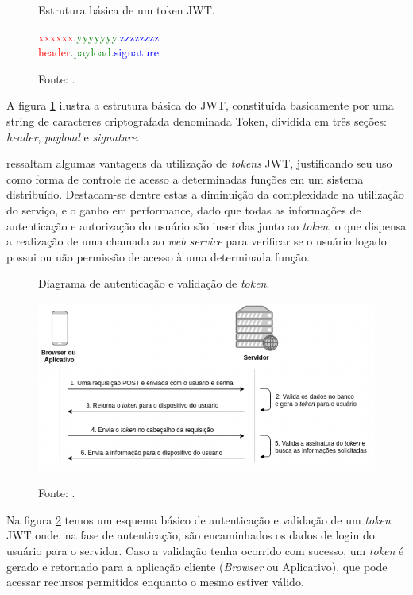 \begin{figure}[H]
	\caption{Estrutura básica de um token JWT.}
	\label{figura:jwt}
	\begin{center}
		\textcolor{red}{xxxxxx}.\textcolor{green}{yyyyyyy}.\textcolor{blue}{zzzzzzzz}\\
		\textcolor{red}{header}.\textcolor{green}{payload}.\textcolor{blue}{signature}\\
	\end{center}
	\caption*{Fonte: .}
\end{figure}

A figura \ref{figura:jwt} ilustra a estrutura básica do JWT, constituída basicamente por uma string de caracteres criptografada denominada Token, dividida em três seções: \textit{header}, \textit{payload} e \textit{signature}.

 ressaltam algumas vantagens da utilização de \textit{tokens} JWT, justificando seu uso como forma de controle de acesso a determinadas funções em um sistema distribuído. Destacam-se dentre estas a diminuição da complexidade na utilização do serviço, e o ganho em performance, dado que todas as informações de autenticação e autorização do usuário são inseridas junto ao \textit{token}, o que dispensa a realização de uma chamada ao \textit{web service} para verificar se o usuário logado possui ou não permissão de acesso à uma determinada função.

\begin{figure}[H]
	\caption{Diagrama de autenticação e validação de \textit{token}.}
	\centering %
	\includegraphics[width=14cm]{resources/jwt-schema.png} %
	\label{figura:jwt-schema}
	\caption*{Fonte: .}
\end{figure}

Na figura \ref{figura:jwt-schema} temos um esquema básico de autenticação e validação de um \textit{token} JWT onde, na fase de autenticação, são encaminhados os dados de login do usuário para o servidor. Caso a validação tenha ocorrido com sucesso, um \textit{token} é gerado e retornado para a aplicação cliente (\textit{Browser} ou Aplicativo), que pode acessar recursos permitidos enquanto o mesmo estiver válido.

